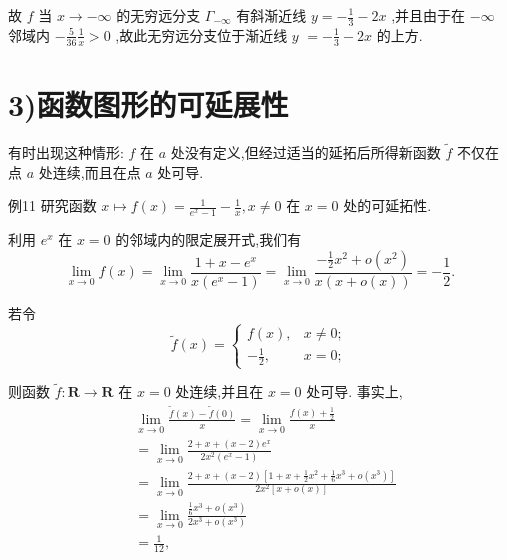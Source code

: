 故 $f$ 当 $x \rightarrow   - \infty$ 的无穷远分支 ${\Gamma }_{-\infty }$ 有斜渐近线 $y =  - \frac{1}{3} - {2x}$ ,并且由于在 $- \infty$ 邻域内 $- \frac{5}{36}\frac{1}{x} > 0$ ,故此无穷远分支位于渐近线 $y$  $=  - \frac{1}{3} - {2x}$ 的上方.

\section*{3)函数图形的可延展性}

有时出现这种情形: $f$ 在 $a$ 处没有定义,但经过适当的延拓后所得新函数 $\widetilde{f}$ 不仅在点 $a$ 处连续,而且在点 $a$ 处可导.

例11 研究函数 $x \mapsto  f\left( x\right)  = \frac{1}{{e}^{x} - 1} - \frac{1}{x},x \neq  0$ 在 $x = 0$ 处的可延拓性.

利用 ${e}^{x}$ 在 $x = 0$ 的邻域内的限定展开式,我们有
$$\mathop{\lim }\limits_{{x \rightarrow  0}}f\left( x\right)  = \mathop{\lim }\limits_{{x \rightarrow  0}}\frac{1 + x - {e}^{x}}{x\left( {{e}^{x} - 1}\right) } = \mathop{\lim }\limits_{{x \rightarrow  0}}\frac{-\frac{1}{2}{x}^{2} + o\left( {x}^{2}\right) }{x\left( {x + o\left( x\right) }\right) } =  - \frac{1}{2}.$$

若令
$$\widetilde{f}\left( x\right)  = \left\{  \begin{array}{ll} f\left( x\right) , & x \neq  0; \\   - \frac{1}{2}, & x = 0; \end{array}\right.$$

则函数 $\widetilde{f} : \mathbf{R} \rightarrow  \mathbf{R}$ 在 $x = 0$ 处连续,并且在 $x = 0$ 处可导. 事实上,
\begin{align*}
	&\mathop{\lim }\limits_{{x \rightarrow  0}}\frac{\widetilde{f}\left( x\right)  - \widetilde{f}\left( 0\right) }{x} = \mathop{\lim }\limits_{{x \rightarrow  0}}\frac{f\left( x\right)  + \frac{1}{2}}{x}\\
	&= \mathop{\lim }\limits_{{x \rightarrow  0}}\frac{2 + x + \left( {x - 2}\right) {e}^{x}}{2{x}^{2}\left( {{e}^{x} - 1}\right) }\\
	&= \mathop{\lim }\limits_{{x \rightarrow  0}}\frac{2 + x + \left( {x - 2}\right) \left\lbrack  {1 + x + \frac{1}{2}{x}^{2} + \frac{1}{6}{x}^{3} + o\left( {x}^{3}\right) }\right\rbrack  }{2{x}^{2}\left\lbrack  {x + o\left( x\right) }\right\rbrack  }\\
	&= \mathop{\lim }\limits_{{x \rightarrow  0}}\frac{\frac{1}{6}{x}^{3} + o\left( {x}^{3}\right) }{2{x}^{3} + o\left( {x}^{3}\right) }\\
	&= \frac{1}{12},
\end{align*}

